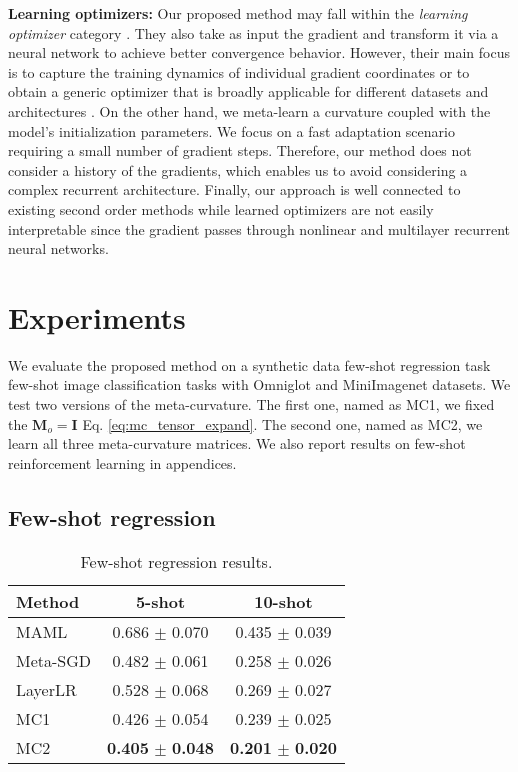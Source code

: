 \documentclass{article}
\newcommand*{\B}[1]{\mathbf{#1}}
\begin{document}
\textbf{Learning optimizers:}
Our proposed method may fall within the \textit{learning optimizer} category \cite{Ravi-iclr-2017, Andrychowicz-nips-2016,Wichrowska-icml17,Metz-arxiv-2018}. They also take as input the gradient and transform it via a neural network to achieve better convergence behavior. However, their main focus is to capture the training dynamics of individual gradient coordinates \cite{Ravi-iclr-2017, Andrychowicz-nips-2016} or to obtain a generic optimizer that is broadly applicable for different datasets and architectures \cite{Wichrowska-icml17,Metz-arxiv-2018,Andrychowicz-nips-2016}. On the other hand, we meta-learn a curvature coupled with the model’s initialization parameters. We focus on a fast adaptation scenario requiring a small number of gradient steps. Therefore, our method does not consider a history of the gradients, which enables us to avoid considering a complex recurrent architecture. Finally, our approach is well connected to existing second order methods while learned optimizers are not easily interpretable since the gradient passes through nonlinear and multilayer recurrent neural networks.

\section{Experiments}
\label{experiments}
We evaluate the proposed method on a synthetic data few-shot regression task few-shot image classification tasks with Omniglot and MiniImagenet datasets. We test two versions of the meta-curvature. The first one, named as MC1, we fixed the $\B{M}_o = \B{I}$ Eq. \ref{eq:mc_tensor_expand}. The second one, named as MC2, we learn all three meta-curvature matrices. We also report results on few-shot reinforcement learning in appendices.

\subsection{Few-shot regression}
\begin{wraptable}{r}{6.5cm}
\caption{Few-shot regression results.}
\label{table:regression}
\begin{small}
\begin{tabular}{lcc}
\toprule
Method & 5-shot & 10-shot \\
\midrule
MAML               & 0.686 $\pm$ 0.070 & 0.435 $\pm$ 0.039 \\
Meta-SGD           & 0.482 $\pm$ 0.061 & 0.258 $\pm$ 0.026 \\
LayerLR            & 0.528 $\pm$ 0.068 & 0.269 $\pm$ 0.027 \\
MC1                & 0.426 $\pm$ 0.054 & 0.239 $\pm$ 0.025 \\
MC2                & \textbf{0.405} $\pm$ \textbf{0.048} & \textbf{0.201} $\pm$ \textbf{0.020} \\
\bottomrule
\end{tabular}
\end{small}
\end{wraptable}
\end{document}
